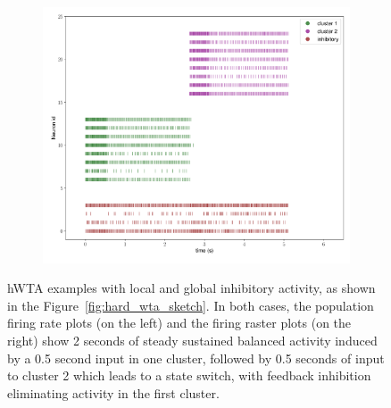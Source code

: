\begin{figure}[p!]
\centering
    \begin{subfigure}{.33\textwidth}
        
        
       \caption{}
        \label{fig:activity_global_inh}
    \end{subfigure}
    \centering
    \begin{subfigure}{.37\textwidth}
        
        \includegraphics[width=\textwidth]{img/chapter3/raster_global_inh_hard_wta.png}
        \caption{}
        \label{fig:raster_global_inh}
    \end{subfigure}
    \hfill
    \centering
    \begin{subfigure}{.35\textwidth}
        
        \caption{}
        \label{fig:activity_global_exc}
    \end{subfigure}
    \centering
    \begin{subfigure}{.35\textwidth}
        
        \caption{}
        \label{fig:raster_global_exc}
    \end{subfigure}
    \caption[\ac{hWTA} network examples with local and global inhibitory activity]{\ac{hWTA} examples with local and global inhibitory activity, as shown in the Figure~\ref{fig:hard_wta_sketch}. In both cases, the population firing rate plots (on the left) and the firing raster plots (on the right) show 2 seconds of steady sustained balanced activity induced by a 0.5 second input in one cluster, followed by 0.5 seconds of input to cluster 2 which leads to a state switch, with feedback inhibition eliminating activity in the first cluster.}
    \label{fig:hard_wta_dynapse_recordings}
\end{figure}

